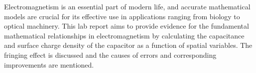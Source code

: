 Electromagnetism is an essential part of modern life, and accurate mathematical models are crucial for its effective use in applications ranging from biology to optical machinery. This lab report aims to provide evidence for the fundamental mathematical relationships in electromagnetism by calculating the capacitance and surface charge density of the capacitor as a function of spatial variables. The fringing effect is discussed and the causes of errors and corresponding improvements are mentioned. 